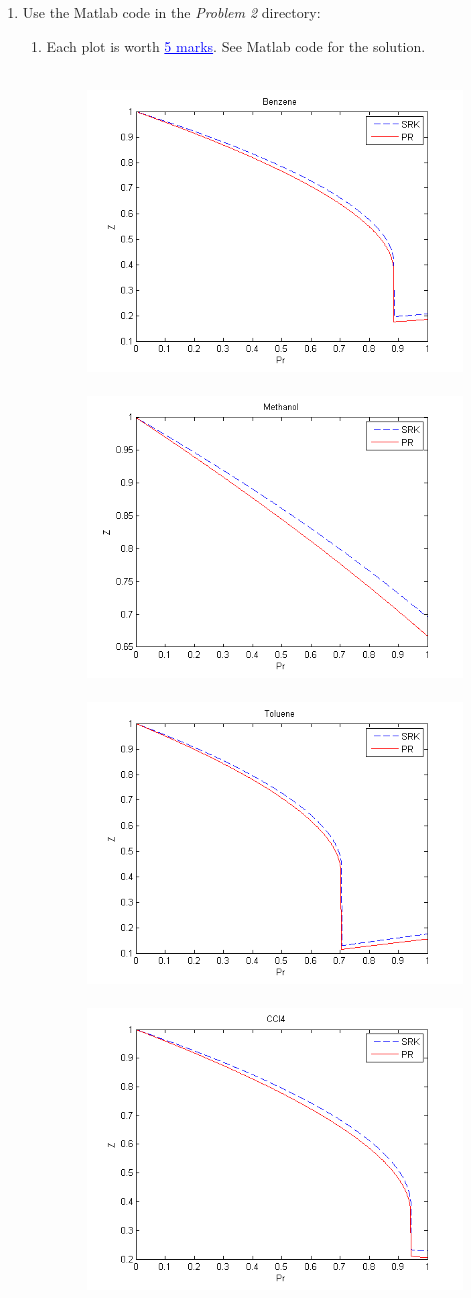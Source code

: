 \documentclass[12pts,a4paper,amsmath,amssymb,floatfix]{article}%
\newcommand{\blue}{\textcolor{blue}}
\begin{document}
\begin{enumerate}[label=\bfseries Problem \arabic*:]
   \item Use the Matlab code in the {\it Problem 2} directory:
      \begin{enumerate}[label=\bfseries Task \arabic*:]
        \item Each plot is worth \blue{\underline{5 marks}}. See Matlab code for the solution.
          \begin{figure}[h]
             \vbox{
                   \hbox{ 
                          \includegraphics[width=8.cm,height=6.cm,clip]{./Figs/Benzene.png}
                          \includegraphics[width=8.cm,height=6.cm,clip]{./Figs/Methanol.png}
                         }
                   \hbox{ 
                          \includegraphics[width=8.cm,height=6.cm,clip]{./Figs/Toluene.png}
                          \includegraphics[width=8.cm,height=6.cm,clip]{./Figs/CCl4.png}
}}
\end{figure}
\end{enumerate}
\end{enumerate}
\end{document}
